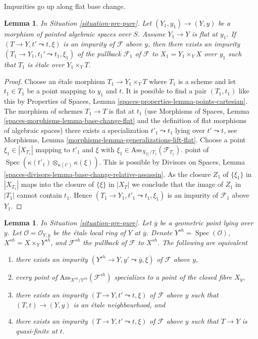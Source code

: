 \documentclass{stacks-project}
\theoremstyle{plain}
\newtheorem{lemma}[subsection]{Lemma}
\theoremstyle{definition}
\theoremstyle{remark}
\numberwithin{equation}{subsection}
\def\Spec{\mathop{\mathrm{Spec}}}
\begin{document}
\noindent
Impurities go up along flat base change.

\begin{lemma}
\label{lemma-flat-ascent-impurity}
In Situation \ref{situation-pre-pure}.
Let $(Y_1, y_1) \to (Y, y)$ be a morphism of pointed
algebraic spaces over $S$. Assume $Y_1 \to Y$ is flat at $y_1$.
If $(T \to Y, t' \leadsto t, \xi)$ is an impurity of
$\mathcal{F}$ above $y$, then there exists an impurity
$(T_1 \to Y_1, t_1' \leadsto t_1, \xi_1)$ of the pullback
$\mathcal{F}_1$ of $\mathcal{F}$ to $X_1 = Y_1 \times_Y X$
over $y_1$ such that $T_1$ is \'etale over $Y_1 \times_Y T$.
\end{lemma}

\begin{proof}
Choose an \'etale morphism $T_1 \to Y_1 \times_Y T$ where $T_1$
is a scheme and let $t_1 \in T_1$ be a point mapping to $y_1$ and $t$.
It is possible to find a pair $(T_1, t_1)$ like this by
Properties of Spaces, Lemma \ref{spaces-properties-lemma-points-cartesian}.
The morphism of schemes $T_1 \to T$ is flat at $t_1$
(use Morphisms of Spaces, Lemma \ref{spaces-morphisms-lemma-base-change-flat}
and the definition of flat morphisms of algebraic spaces)
there exists a specialization $t'_1 \leadsto t_1$ lying over
$t' \leadsto t$, see
Morphisms, Lemma \ref{morphisms-lemma-generalizations-lift-flat}.
Choose a point $\xi_1 \in |X_{T_1}|$ mapping to $t'_1$
and $\xi$ with $\xi_1 \in \text{Ass}_{X_{T_1}/T_1}(\mathcal{F}_{T_1})$.
point of $\Spec(\kappa(t'_1) \otimes_{\kappa(t')} \kappa(\xi))$.
This is possible by
Divisors on Spaces, Lemma
\ref{spaces-divisors-lemma-base-change-relative-assassin}.
As the closure $Z_1$ of $\{\xi_1\}$ in $|X_{T_1}|$ maps into the
closure of $\{\xi\}$ in $|X_T|$ we conclude that
the image of $Z_1$ in $|T_1|$ cannot contain $t_1$.
Hence $(T_1 \to Y_1, t'_1 \leadsto t_1, \xi_1)$
is an impurity of $\mathcal{F}_1$ above $Y_1$.
\end{proof}

\begin{lemma}
\label{lemma-pure-along-X-y}
In Situation \ref{situation-pre-pure}. Let $\overline{y}$ be a geometric
point lying over $y$. Let $\mathcal{O} = \mathcal{O}_{Y, \overline{y}}$
be the \'etale local ring of $Y$ at $\overline{y}$. Denote
$Y^{sh} = \Spec(\mathcal{O})$, $X^{sh} = X \times_Y Y^{sh}$, and
$\mathcal{F}^{sh}$ the pullback of $\mathcal{F}$ to $X^{sh}$.
The following are equivalent
\begin{enumerate}
\item there exists an impurity
$(Y^{sh} \to Y, y' \leadsto \overline{y}, \xi)$
of $\mathcal{F}$ above $y$,
\item every point of $\text{Ass}_{X^{sh}/Y^{sh}}(\mathcal{F}^{sh})$
specializes to a point of the closed fibre $X_{\overline{y}}$,
\item there exists an impurity $(T \to Y, t' \leadsto t, \xi)$
of $\mathcal{F}$ above $y$ such that $(T, t) \to (Y, y)$ is an
\'etale neighbourhood, and
\item there exists an impurity $(T \to Y, t' \leadsto t, \xi)$
of $\mathcal{F}$ above $y$ such that $T \to Y$ is quasi-finite at $t$.
\end{enumerate}
\end{lemma}
\end{document}

